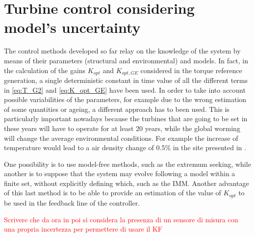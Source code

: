 \section{Turbine control considering model's uncertainty}\label{sec:c_other_controls}
The control methods developed so far relay on the knowledge of the system by means of their parameters (structural and environmental) and models. In fact, in the calculation of the gains $K_{opt}$ and $K_{opt,GE}$ considered in the torque reference generation, a single deterministic constant in time value of all the different terms in \autoref{eq:T_G2} and \autoref{eq:K_opt_GE} have been used. In order to take into account possible variabilities of the parameters, for example due to the wrong estimation of some quantities or ageing, a different approach has to been used. This is particularly important nowadays because the turbines that are going to be set in these years will have to operate for at least 20 years, while the global worming will change the average environmental conditions. For example the increase of temperature would lead to a air density change of 0.5\% in the site presented in \cite{en12112038}.

One possibility is to use model-free methods, such as the extremum seeking, while another is to suppose that the system may evolve following a model within a finite set, without explicitly defining which, such as the \acrfull{IMM}. Another advantage of this last method is to be able to provide an estimation of the value of $K_{opt}$ to be used in the feedback line of the controller. 

\textcolor{red}{Scrivere che da ora in poi si considera la presenza di un sensore di misura con una propria incertezza per permettere di usare il KF}


